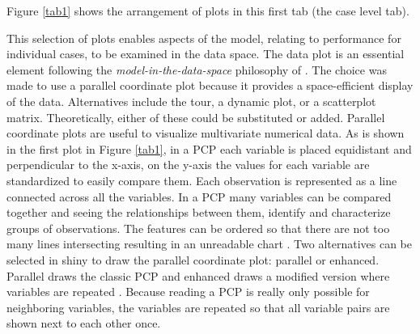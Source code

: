 \documentclass[smallextended,natbib]{svjour3}\usepackage[]{graphicx}\usepackage[]{xcolor}
\begin{document}
Figure \ref{tab1} shows the arrangement of plots in this first tab (the case level tab).

This selection of plots enables aspects of the model, relating to performance for individual cases, to be examined in the data space. The data plot is an essential element following the {\em model-in-the-data-space} philosophy of \citet{wickham2015visualizing}. The choice was made to use a parallel coordinate plot because it provides a space-efficient display of the data. Alternatives include the tour, a dynamic plot, or a scatterplot matrix. Theoretically, either of these could be substituted or added. 
Parallel coordinate plots are useful to visualize multivariate numerical data. As is shown in the first plot in Figure \ref{tab1}, in a PCP each variable is placed equidistant and perpendicular to the x-axis, on the y-axis the values for each variable are standardized to easily compare them. Each observation is represented as a line connected across  all the variables. In a PCP many variables can be compared together and seeing the relationships between them, identify and characterize groups of observations. The features can be ordered so that there are not too many lines intersecting resulting in an unreadable chart \citep{inselberg2009parallel}. 
Two alternatives can be selected in shiny to draw the parallel coordinate plot: parallel or enhanced. Parallel draws the classic PCP and enhanced draws a modified version where variables are repeated \citep{hurley2011eulerian}. Because reading a PCP is really only possible for neighboring variables, the variables are repeated so that all variable pairs are shown next to each other once.
\end{document}
